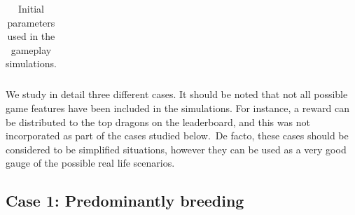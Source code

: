 \documentclass[12pt]{article}
\begin{document}
{\begin{table}[H]
\begin{tabular}{p{2.94in}p{2.94in}}
\end{tabular}\caption{Initial parameters used in the gameplay simulations.}
\label{tab:Initial parameters used in the gameplay simulations.}

 \end{table}




We study in detail three different cases. It should be noted that not all possible game features have been included in the simulations. For instance, a reward can be distributed to the top dragons on the leaderboard, and this was not incorporated as part of the cases studied below.\ De facto, these cases should be considered to be simplified situations,  however they can be used as a very good gauge of the possible real life scenarios.\par

\subsection{Case 1: Predominantly breeding}
\label{Case 1: Predominantly breeding} \par




}
\end{document}
